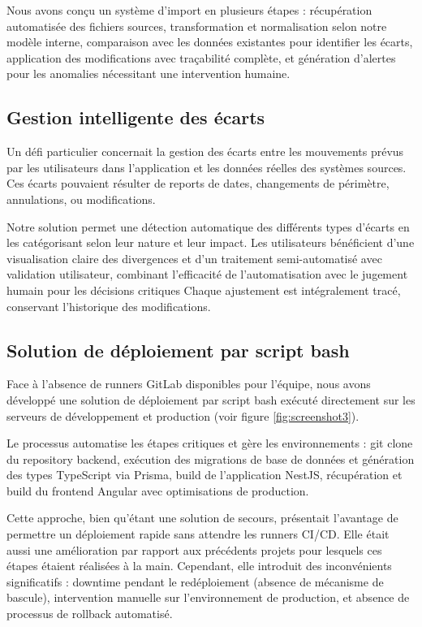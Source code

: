 Nous avons conçu un système d'import en plusieurs étapes : récupération automatisée des fichiers sources, transformation et normalisation selon notre modèle interne, comparaison avec les données existantes pour identifier les écarts, application des modifications avec traçabilité complète, et génération d'alertes pour les anomalies nécessitant une intervention humaine.

\subsection{Gestion intelligente des écarts}
Un défi particulier concernait la gestion des écarts entre les mouvements prévus par les utilisateurs dans l'application et les données réelles des systèmes sources.
Ces écarts pouvaient résulter de reports de dates, changements de périmètre, annulations, ou modifications.

Notre solution permet une détection automatique des différents types d'écarts en les catégorisant selon leur nature et leur impact.
Les utilisateurs bénéficient d'une visualisation claire des divergences et d'un traitement semi-automatisé avec validation utilisateur, combinant l'efficacité de l'automatisation avec le jugement humain pour les décisions critiques
Chaque ajustement est intégralement tracé, conservant l'historique des modifications.

\subsection{Solution de déploiement par script bash}
Face à l'absence de runners GitLab disponibles pour l'équipe, nous avons développé une solution de déploiement par script bash exécuté directement sur les serveurs de développement et production (voir figure \ref{fig:screenshot3}).

Le processus automatise les étapes critiques et gère les environnements : git clone du repository backend, exécution des migrations de base de données et génération des types TypeScript via Prisma, build de l'application NestJS, récupération et build du frontend Angular avec optimisations de production.

Cette approche, bien qu'étant une solution de secours, présentait l'avantage de permettre un déploiement rapide sans attendre les runners CI/CD. Elle était aussi une amélioration par rapport aux précédents projets pour lesquels ces étapes étaient réalisées à la main. Cependant, elle introduit des inconvénients significatifs : downtime pendant le redéploiement (absence de mécanisme de bascule), intervention manuelle sur l'environnement de production, et absence de processus de rollback automatisé.

